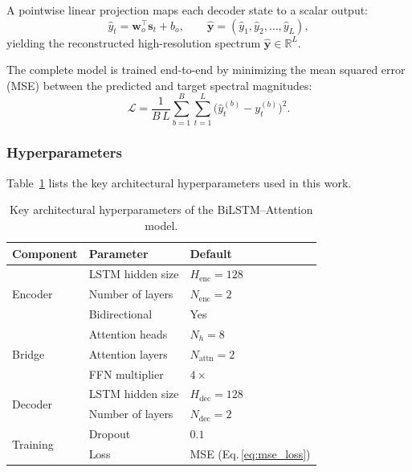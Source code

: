 \documentclass[12pt,a4paper]{report}
\begin{document}
A pointwise linear projection maps each decoder state to a scalar output:
\begin{equation}
  \hat{y}_t = \mathbf{w}_o^\top \mathbf{s}_t + b_o, \qquad
  \hat{\mathbf{y}} = (\hat{y}_1, \hat{y}_2, \dots, \hat{y}_L),
  \label{eq:output_head}
\end{equation}
yielding the reconstructed high-resolution spectrum $\hat{\mathbf{y}} \in \mathbb{R}^L$.

The complete model is trained end-to-end by minimizing the mean squared error (MSE) between the predicted and target spectral magnitudes:
\begin{equation}
  \mathcal{L} = \frac{1}{B\,L} \sum_{b=1}^B \sum_{t=1}^L \big( \hat{y}_t^{(b)} - y_t^{(b)} \big)^2.
  \label{eq:mse_loss}
\end{equation}

\bigskip
\subsubsection{Hyperparameters}

Table~\ref{tab:model-params} lists the key architectural hyperparameters used in this work.

\begin{table}[htbp]
  \centering
  \caption{Key architectural hyperparameters of the BiLSTM--Attention model.}
  \label{tab:model-params}
  \begin{tabular}{@{}lll@{}}
    \toprule
    \textbf{Component} & \textbf{Parameter} & \textbf{Default} \\
    \midrule
    \multirow{3}{*}{Encoder}  & LSTM hidden size & $H_{\mathrm{enc}} = 128$ \\
    & Number of layers & $N_{\mathrm{enc}} = 2$ \\
    & Bidirectional    & Yes \\
    \midrule
    \multirow{3}{*}{Bridge}   & Attention heads   & $N_h = 8$ \\
    & Attention layers  & $N_{\mathrm{attn}} = 2$ \\
    & FFN multiplier    & $4 \times$ \\
    \midrule
    \multirow{2}{*}{Decoder}  & LSTM hidden size & $H_{\mathrm{dec}} = 128$ \\
    & Number of layers & $N_{\mathrm{dec}} = 2$ \\
    \midrule
    \multirow{2}{*}{Training}  & Dropout          & $0.1$ \\
    & Loss             & MSE (Eq.\,\ref{eq:mse_loss}) \\
    \bottomrule
  \end{tabular}
\end{table}
\end{document}
